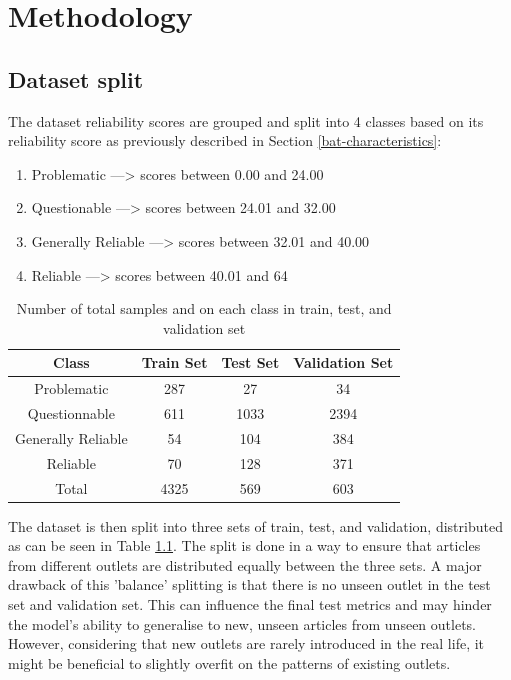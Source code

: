 \chapter{Methodology}
\label{cha:4}

\section{Dataset split}

The dataset reliability scores are grouped and split into 4 classes based on its reliability score as previously described in Section \ref{bat-characteristics}:
\begin{enumerate}
    \item Problematic ---> scores between 0.00 and 24.00
    \item Questionable ---> scores between 24.01 and 32.00
    \item Generally Reliable ---> scores between 32.01 and 40.00
    \item Reliable ---> scores between 40.01 and 64
\end{enumerate}

\begin{table}[htbp]
    \centering
    \begin{tabular}{| c | c | c | c |}
        \hline
        Class              & Train Set & Test Set & Validation Set \\
        \hline
        Problematic        & 287       & 27       & 34             \\
        Questionnable      & 611       & 1033     & 2394           \\
        Generally Reliable & 54        & 104      & 384            \\
        Reliable           & 70        & 128      & 371            \\
        \hline
        Total              & 4325      & 569      & 603            \\
        \hline
    \end{tabular}
    \caption{Number of total samples and on each class in train, test, and validation set}
    \label{table:dataset_split}
\end{table}

The dataset is then split into three sets of train, test, and validation, distributed as can be seen in Table \ref{table:dataset_split}. The split is done in a way to ensure that articles from different outlets are distributed equally between the three sets. A major drawback of this 'balance' splitting is that there is no unseen outlet in the test set and validation set. This can influence the final test metrics and may hinder the model's ability to generalise to new, unseen articles from unseen outlets. However, considering that new outlets are rarely introduced in the real life, it might be beneficial to slightly overfit on the patterns of existing outlets.


